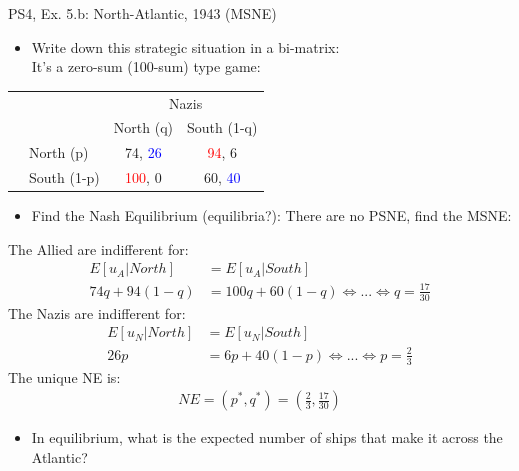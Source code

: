 \begin{frame}{PS4, Ex. 5.b: North-Atlantic, 1943 (MSNE)}
    \begin{itemize}
      \item[(a)] Write down this strategic situation in a bi-matrix: \\ It's a zero-sum (100-sum) type game:
    \end{itemize}
    \vspace{-12pt}
    \begin{table}
      \begin{tabular}{cl|c|c|}
          & \multicolumn{1}{c}{} & \multicolumn{2}{c}{\color{blue}Nazis}\\
          \parbox[t]{1mm}{}
          &  &  &  \\
          & North (p)    & 74, \textcolor{blue}{26} & \textcolor{red}{94}, 6 \\
          & South (1-p)  & \textcolor{red}{100}, 0 & 60, \textcolor{blue}{40} \\
      \end{tabular}
    \end{table}
    \begin{itemize}
      \item[(b)] Find the Nash Equilibrium (equilibria?): There are no PSNE, find the MSNE:
    \end{itemize}
    The Allied are indifferent for:
    \begin{align*}
      E[u_A|North]&=E[u_A|South]\\
      74q + 94(1-q) &= 100q + 60(1-q) \Leftrightarrow ... \Leftrightarrow q = \frac{17}{30}
    \end{align*}
    The Nazis are indifferent for:
    \begin{align*}
      E[u_N|North]&=E[u_N|South]\\
      26p &= 6p + 40(1-p) \Leftrightarrow ... \Leftrightarrow p = \frac{2}{3}
    \end{align*}
    The unique NE is:
    \begin{align*}
       NE=(p^{*},q^{*})=\left(\frac{2}{3},\frac{17}{30}\right)
    \end{align*}
    \vspace{-10pt}
    \begin{itemize}
      \item[(c)] In equilibrium, what is the expected number of ships that make it across the Atlantic?
    \end{itemize}
  \vfill\null
\end{frame}

